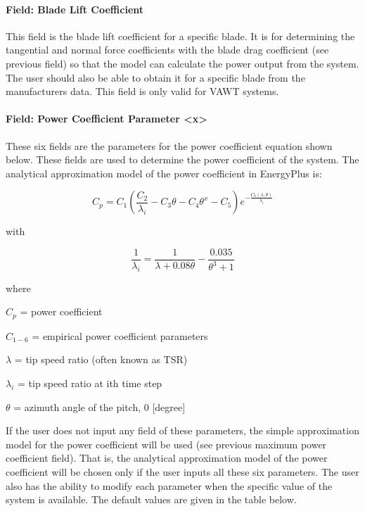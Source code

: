 \paragraph{Field: Blade Lift Coefficient}\label{field-blade-lift-coefficient}

This field is the blade lift coefficient for a specific blade. It is for determining the tangential and normal force coefficients with the blade drag coefficient (see previous field) so that the model can calculate the power output from the system. The user should also be able to obtain it for a specific blade from the manufacturers data. This field is only valid for VAWT systems.

\paragraph{Field: Power Coefficient Parameter \textless{}x\textgreater{}}\label{field-power-coefficient-parameter-x}

These six fields are the parameters for the power coefficient equation shown below. These fields are used to determine the power coefficient of the system. The analytical approximation model of the power coefficient in EnergyPlus is:

\begin{equation}
{C_p} = {C_1}(\frac{{{C_2}}}{{{\lambda_i}}} - {C_3}\theta  - {C_4}{\theta ^x} - {C_5}){e^{ - \frac{{{C_6}(\lambda ,\theta )}}{{{\lambda_i}}}}}
\end{equation}

with

\begin{equation}
\frac{1}{{{\lambda_i}}} = \frac{1}{{\lambda  + 0.08\theta }} - \frac{{0.035}}{{{\theta ^3} + 1}}
\end{equation}

where

\(C_p\) = power coefficient

\(C_{1-6}\) = empirical power coefficient parameters

\(\lambda\) = tip speed ratio (often known as TSR)

\(\lambda_i\) = tip speed ratio at ith time step

\(\theta\) = azimuth angle of the pitch, 0 {[}degree{]}

If the user does not input any field of these parameters, the simple approximation model for the power coefficient will be used (see previous maximum power coefficient field). That is, the analytical approximation model of the power coefficient will be chosen only if the user inputs all these six parameters. The user also has the ability to modify each parameter when the specific value of the system is available. The default values are given in the table below.

